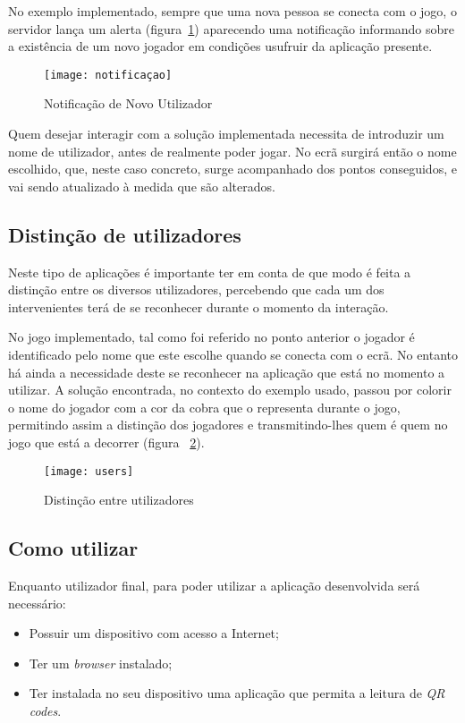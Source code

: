 	No exemplo implementado, sempre que uma nova pessoa se conecta com o jogo, o servidor lança um alerta (figura~\ref{fig:novo}) aparecendo uma notificação informando sobre a existência de um novo jogador em condições usufruir da aplicação presente. 
	
	\begin{figure}[ht]
		\centering
		\texttt{[image: notificaçao]}
		\caption[Novo Utilizador] {Notificação de Novo Utilizador}
		\label{fig:novo}
	\end{figure}

	Quem desejar interagir com a solução implementada necessita de introduzir um nome de utilizador, antes de realmente poder jogar. No ecrã surgirá então o nome escolhido, que, neste caso concreto, surge acompanhado dos pontos conseguidos, e vai sendo atualizado à medida que são alterados.
	

	\subsection{Distinção de utilizadores}

	Neste tipo de aplicações é importante ter em conta de que modo é feita a distinção entre os diversos utilizadores, percebendo que cada um dos intervenientes terá de se reconhecer durante o momento da interação. 

	No jogo implementado, tal como foi referido no ponto anterior o jogador é identificado pelo nome que este escolhe quando se conecta com o ecrã. No entanto há ainda a necessidade deste se reconhecer na aplicação que está no momento a utilizar. A solução encontrada, no contexto do exemplo usado, passou por colorir o nome do jogador com a cor da cobra que o representa durante o jogo, permitindo assim a distinção dos jogadores e transmitindo-lhes quem é quem no jogo que está a decorrer (figura ~\ref{fig:user}).

	\begin{figure}[ht]
		\centering
		\texttt{[image: users]}
		\caption[Distinção de Utilizadores]{Distinção entre utilizadores}
		\label{fig:user}
	\end{figure}

	\subsection{Como utilizar}

	Enquanto utilizador final, para poder utilizar a aplicação desenvolvida será necessário:
	\begin{itemize}
		\item Possuir um dispositivo com acesso a Internet;
		\item Ter um \textit{browser} instalado;
		\item Ter instalada no seu dispositivo uma aplicação que permita a leitura de \textit{QR codes}.
	\end{itemize}

